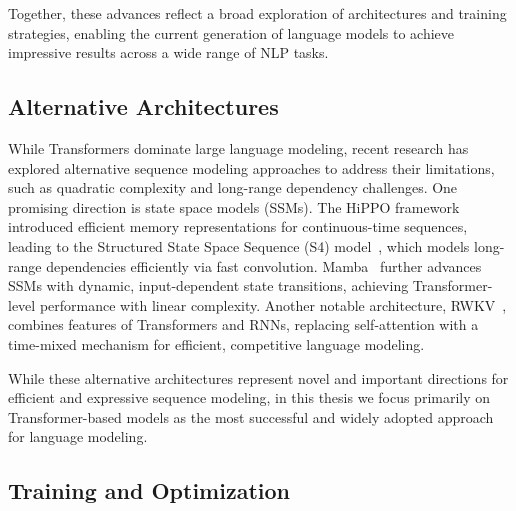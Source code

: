 Together, these advances reflect a broad exploration of architectures and training strategies, enabling the current generation of language models to achieve impressive results across a wide range of NLP tasks.

\subsection{Alternative Architectures}
While Transformers dominate large language modeling, recent research has explored alternative sequence modeling approaches to address their limitations, such as quadratic complexity and long-range dependency challenges. One promising direction is state space models (SSMs). The HiPPO framework~\citep{gu2020hippo} introduced efficient memory representations for continuous-time sequences, leading to the Structured State Space Sequence (S4) model~\citep{gu2021efficiently}, which models long-range dependencies efficiently via fast convolution. Mamba~\citep{gu2023mamba} further advances SSMs with dynamic, input-dependent state transitions, achieving Transformer-level performance with linear complexity. Another notable architecture, RWKV~\citep{peng2023rwkv}, combines features of Transformers and RNNs, replacing self-attention with a time-mixed mechanism for efficient, competitive language modeling. 

While these alternative architectures represent novel and important directions for efficient and expressive sequence modeling, in this thesis we focus primarily on Transformer-based models as the most successful and widely adopted approach for language modeling.

\subsection{Training and Optimization}

